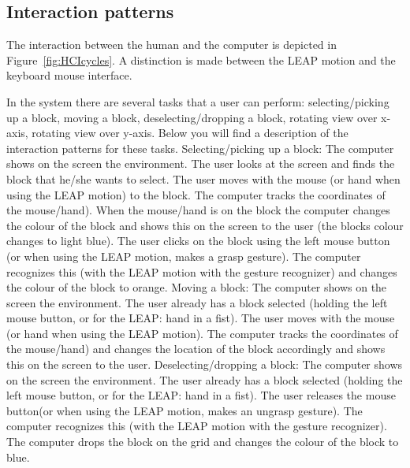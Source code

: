 \subsection{Interaction patterns}
The interaction between the human and the computer is depicted in Figure~\ref{fig:HCIcycles}. A distinction is made between the LEAP motion and the keyboard mouse interface. 

In the system there are several tasks that a user can perform: selecting/picking up a block, moving a block, deselecting/dropping a block, rotating view over x-axis, rotating view over y-axis. Below you will find a description of the interaction patterns for these tasks.
\newline\newline
Selecting/picking up a block: 
\newline The computer shows on the screen the environment. The user looks at the screen and finds the block that he/she wants to select. The user moves with the mouse (or hand when using the LEAP motion) to the block. The computer tracks the coordinates of the mouse/hand). When the mouse/hand is on the block the computer changes the colour of the block and shows this on the screen to the user (the blocks colour changes to light blue). The user clicks on the block using the left mouse button (or when using the LEAP motion, makes a grasp gesture). The computer recognizes this (with the LEAP motion with the gesture recognizer) and changes the colour of the block to orange.
\newline\newline
Moving a block: 
\newline The computer shows on the screen the environment. The user already has a block selected (holding the left mouse button, or for the LEAP: hand in a fist). The user moves with the mouse (or hand when using the LEAP motion). The computer tracks the coordinates of the mouse/hand) and changes the location of the block accordingly and shows this on the screen to the user. 
\newline\newline
Deselecting/dropping a block: 
\newline The computer shows on the screen the environment. The user already has a block selected (holding the left mouse button, or for the LEAP: hand in a fist). The user releases the mouse button(or when using the LEAP motion, makes an ungrasp gesture). The computer recognizes this (with the LEAP motion with the gesture recognizer). The computer drops the block on the grid and changes the colour of the block to blue.

